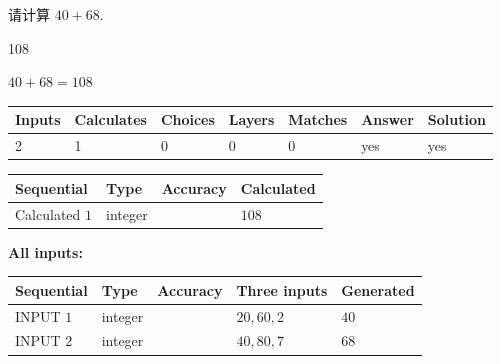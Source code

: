 \documentclass{ctexart}
\begin{document}
  
 
请计算 $ %
40 +  %
68 $.
 
 
 
\noindent{}
 
 

108
 
 
\noindent{}
 
 

 
 
 
\noindent{}
 
 

$ %
40 +  %
68=   %
108$
 
 
\noindent{}
 
 

 
   
   
   
   
\noindent\begin{tabular}{|l|l|l|l|l|l|l|}
 \hline
Inputs & Calculates & Choices & Layers & Matches & Answer & Solution \\ \hline
 2  & 
 1  & 
 0
  & 
 0  & 
 0  & 
  yes & 
  yes 
  \\ \hline
 \end{tabular}
   
   
   
   
\noindent{}
   
   
  
  
\noindent\begin{tabular}{|l|l|l|l|}
\hline
 Sequential & Type & Accuracy & Calculated \\ 
\hline
 
 
  Calculated $  1 $ & integer &  & 
  $ 108 $ 
 \\  \hline  
 \end{tabular}
   
   
   
   
\noindent\vspace{0.1in}\hspace{-0.08in} {\textbf{\Large{All inputs: }}}
   
   
  
  
\noindent\begin{tabular}{|l|l|l|l|l|}
\hline
 Sequential & Type & Accuracy & Three inputs & Generated \\ 
\hline
 
 
  INPUT $  1 $ & integer &  & $
 20
 , 
 60
 , 
 2
 $ & $ 40 $ 
 \\  \hline  
 
 
  INPUT $  2 $ & integer &  & $
 40
 , 
 80
 , 
 7
 $ & $ 68 $ 
 \\  \hline  
 \end{tabular}
   
\end{document}
